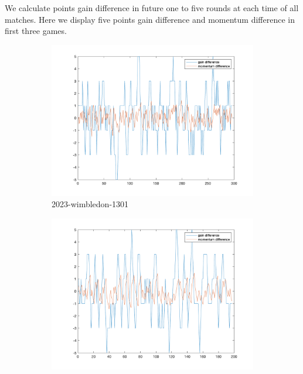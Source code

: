 We calculate points gain difference in future one to five rounds at each time of all matches.
Here we display five points gain difference and momentum difference in first three games.

\begin{figure}[H]
    \centering
    \begin{subfigure}[b]{0.34\textwidth}
        \includegraphics[width=\linewidth]{mainmatter/photos/diff_match1.png}
        \caption{2023-wimbledon-1301}
    \end{subfigure}\hspace{-0.02\textwidth}
    \begin{subfigure}[b]{0.34\textwidth}
        \includegraphics[width=\linewidth]{mainmatter/photos/diff_match2.png}

\end{subfigure}
\end{figure}
